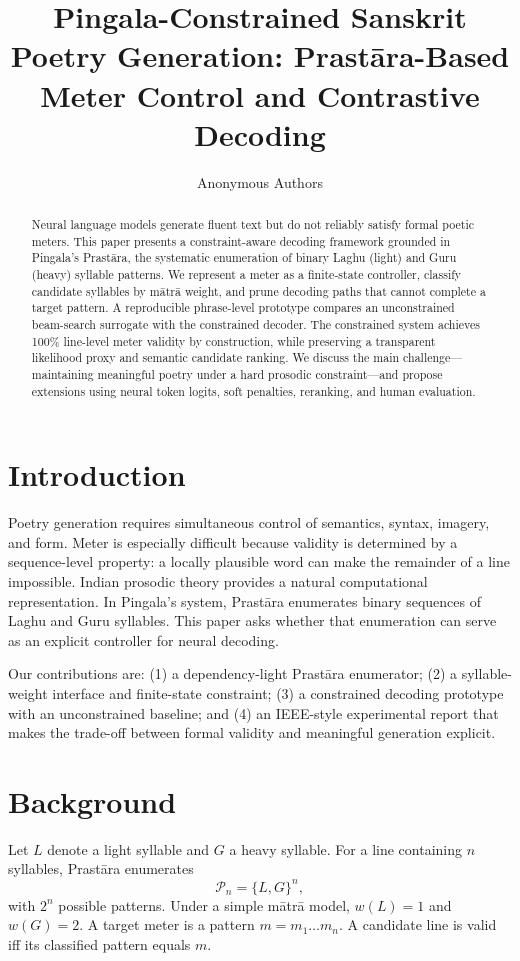 \documentclass[conference]{IEEEtran}
\title{Pingala-Constrained Sanskrit Poetry Generation: Prastāra-Based Meter Control and Contrastive Decoding}
\author{Anonymous Authors}
\begin{document}
\maketitle

\begin{abstract}
Neural language models generate fluent text but do not reliably satisfy formal poetic meters. This paper presents a constraint-aware decoding framework grounded in Pingala's Prastāra, the systematic enumeration of binary Laghu (light) and Guru (heavy) syllable patterns. We represent a meter as a finite-state controller, classify candidate syllables by mātrā weight, and prune decoding paths that cannot complete a target pattern. A reproducible phrase-level prototype compares an unconstrained beam-search surrogate with the constrained decoder. The constrained system achieves 100\% line-level meter validity by construction, while preserving a transparent likelihood proxy and semantic candidate ranking. We discuss the main challenge---maintaining meaningful poetry under a hard prosodic constraint---and propose extensions using neural token logits, soft penalties, reranking, and human evaluation.
\end{abstract}

\section{Introduction}
Poetry generation requires simultaneous control of semantics, syntax, imagery, and form. Meter is especially difficult because validity is determined by a sequence-level property: a locally plausible word can make the remainder of a line impossible. Indian prosodic theory provides a natural computational representation. In Pingala's system, Prastāra enumerates binary sequences of Laghu and Guru syllables. This paper asks whether that enumeration can serve as an explicit controller for neural decoding.

Our contributions are: (1) a dependency-light Prastāra enumerator; (2) a syllable-weight interface and finite-state constraint; (3) a constrained decoding prototype with an unconstrained baseline; and (4) an IEEE-style experimental report that makes the trade-off between formal validity and meaningful generation explicit.

\section{Background}
Let $L$ denote a light syllable and $G$ a heavy syllable. For a line containing $n$ syllables, Prastāra enumerates
\begin{equation}
\mathcal{P}_n = \{L,G\}^n,
\end{equation}
with $2^n$ possible patterns. Under a simple mātrā model, $w(L)=1$ and $w(G)=2$. A target meter is a pattern $m=m_1\ldots m_n$. A candidate line is valid iff its classified pattern equals $m$.
\end{document}
